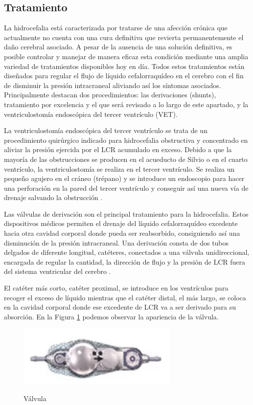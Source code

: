 \subsection{Tratamiento}

La hidrocefalia está caracterizada por tratarse de una afección crónica que actualmente no cuenta con una cura definitiva que revierta permanentemente el daño cerebral asociado. A pesar de la ausencia de una solución definitiva, es posible controlar y manejar de manera eficaz esta condición mediante una amplia variedad de tratamientos disponibles hoy en día. Todos estos tratamientos están diseñados para regular el flujo de líquido cefalorraquídeo en el cerebro con el fin de disminuir la presión intracraneal aliviando así los síntomas asociados. Principalmente destacan dos procedimientos: las derivaciones (shunts), tratamiento por excelencia y el que será revisado a lo largo de este apartado, y la ventriculostomía endoscópica del tercer ventrículo (VET). 

La ventriculostomía endoscópica del tercer ventrículo se trata de un procedimiento quirúrgico indicado para hidrocefalia obstructiva y concentrado en aliviar la presión ejercida por el LCR acumulado en exceso. Debido a que la mayoría de las obstrucciones se producen en el acueducto de Silvio o en el cuarto ventrículo, la ventriculostomía se realiza en el tercer ventrículo. Se realiza un pequeño agujero en el cráneo (trépano) y se introduce un endoscopio para hacer una perforación en la pared del tercer ventrículo y conseguir así una nueva vía de drenaje salvando la obstrucción \cite{vet}. 

Las válvulas de derivación son el principal tratamiento para la hidrocefalia. Estos dispositivos médicos permiten el drenaje del líquido cefalorraquídeo excedente hacia otra cavidad corporal donde pueda ser reabsorbido, consiguiendo así una disminución de la presión intracraneal. Una derivación consta de dos tubos delgados de diferente longitud, catéteres, conectados a una válvula unidireccional, encargada de regular la cantidad, la dirección de flujo y la presión de LCR fuera del sistema ventricular del cerebro \cite{derivacion}.

El catéter más corto, catéter proximal, se introduce en los ventrículos para recoger el exceso de líquido mientras que el catéter distal, el más largo, se coloca en la cavidad corporal donde ese excedente de LCR va a ser derivado para su absorción. En la Figura \ref{fig:valvula} podemos observar la apariencia de la válvula. 
\begin{figure}[h]
    \centering
    \includegraphics[width=0.7\textwidth]{img/valvula.PNG}
    \caption{Válvula}
    \cite{derivacion}
    \label{fig:valvula}
\end{figure}

